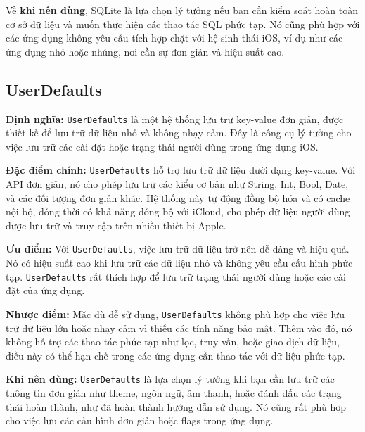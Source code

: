 \vspace{0.5em}

Về \textbf{khi nên dùng}, SQLite là lựa chọn lý tưởng nếu bạn cần kiểm soát hoàn toàn cơ sở dữ liệu và muốn thực hiện các thao tác SQL phức tạp. Nó cũng phù hợp với các ứng dụng không yêu cầu tích hợp chặt với hệ sinh thái iOS, ví dụ như các ứng dụng nhỏ hoặc nhúng, nơi cần sự đơn giản và hiệu suất cao.

\subsection{UserDefaults}
\textbf{Định nghĩa:} \texttt{UserDefaults} là một hệ thống lưu trữ key-value đơn giản, được thiết kế để lưu trữ dữ liệu nhỏ và không nhạy cảm. Đây là công cụ lý tưởng cho việc lưu trữ các cài đặt hoặc trạng thái người dùng trong ứng dụng iOS.

\vspace{0.5em}

\textbf{Đặc điểm chính:} \texttt{UserDefaults} hỗ trợ lưu trữ dữ liệu dưới dạng key-value. Với API đơn giản, nó cho phép lưu trữ các kiểu cơ bản như String, Int, Bool, Date, và các đối tượng đơn giản khác. Hệ thống này tự động đồng bộ hóa và có cache nội bộ, đồng thời có khả năng đồng bộ với iCloud, cho phép dữ liệu người dùng được lưu trữ và truy cập trên nhiều thiết bị Apple.

\vspace{0.5em}

\textbf{Ưu điểm:} Với \texttt{UserDefaults}, việc lưu trữ dữ liệu trở nên dễ dàng và hiệu quả. Nó có hiệu suất cao khi lưu trữ các dữ liệu nhỏ và không yêu cầu cấu hình phức tạp. \texttt{UserDefaults} rất thích hợp để lưu trữ trạng thái người dùng hoặc các cài đặt của ứng dụng.

\vspace{0.5em}

\textbf{Nhược điểm:} Mặc dù dễ sử dụng, \texttt{UserDefaults} không phù hợp cho việc lưu trữ dữ liệu lớn hoặc nhạy cảm vì thiếu các tính năng bảo mật. Thêm vào đó, nó không hỗ trợ các thao tác phức tạp như lọc, truy vấn, hoặc giao dịch dữ liệu, điều này có thể hạn chế trong các ứng dụng cần thao tác với dữ liệu phức tạp.

\vspace{0.5em}

\textbf{Khi nên dùng:} \texttt{UserDefaults} là lựa chọn lý tưởng khi bạn cần lưu trữ các thông tin đơn giản như theme, ngôn ngữ, âm thanh, hoặc đánh dấu các trạng thái hoàn thành, như đã hoàn thành hướng dẫn sử dụng. Nó cũng rất phù hợp cho việc lưu các cấu hình đơn giản hoặc flags trong ứng dụng.

